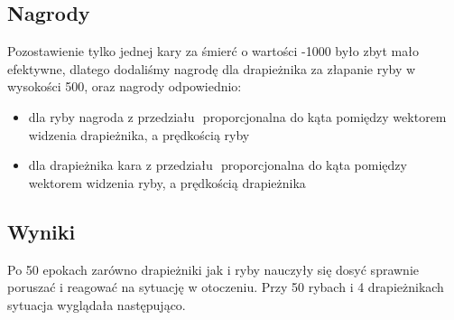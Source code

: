 \documentclass{article}
\begin{document}
\subsection{Nagrody}
Pozostawienie tylko jednej kary za śmierć o wartości -1000 było zbyt mało efektywne, dlatego dodaliśmy nagrodę dla drapieżnika za złapanie ryby w wysokości 500, oraz nagrody odpowiednio:
\begin{itemize}
    \item dla ryby nagroda z przedziału \(<-200, 200>\) proporcjonalna do kąta pomiędzy wektorem widzenia drapieżnika, a prędkością ryby
    \item dla drapieżnika kara z przedziału \(<-400, 400>\) proporcjonalna do kąta pomiędzy wektorem widzenia ryby, a prędkością drapieżnika
\end{itemize}
\subsection{Wyniki}
Po 50 epokach zarówno drapieżniki jak i ryby nauczyły się dosyć sprawnie poruszać i reagować na sytuację w otoczeniu. Przy 50 rybach i 4 drapieżnikach sytuacja wyglądała następująco.
\end{document}
